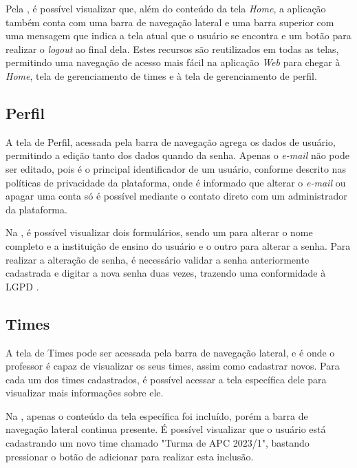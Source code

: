 
Pela , é possível visualizar que, além do conteúdo da tela \textit{Home}, a aplicação também conta com uma barra de navegação lateral e uma barra superior com uma mensagem que indica a tela atual que o usuário se encontra e um botão para realizar o \textit{logout} ao final dela. Estes recursos são reutilizados em todas as telas, permitindo uma navegação de acesso mais fácil na aplicação \textit{Web} para chegar à \textit{Home}, tela de gerenciamento de times e à tela de gerenciamento de perfil.

\subsection{Perfil}

A tela de Perfil, acessada pela barra de navegação agrega os dados de usuário, permitindo a edição tanto dos dados quando da senha. Apenas o \textit{e-mail} não pode ser editado, pois é o principal identificador de um usuário, conforme descrito nas políticas de privacidade da plataforma, onde é informado que alterar o \textit{e-mail} ou apagar uma conta só é possível mediante o contato direto com um administrador da plataforma.


Na , é possível visualizar dois formulários, sendo um para alterar o nome completo e a instituição de ensino do usuário e o outro para alterar a senha. Para realizar a alteração de senha, é necessário validar a senha anteriormente cadastrada e digitar a nova senha duas vezes, trazendo uma conformidade à LGPD \cite{lgpd}.

\subsection{Times}

A tela de Times pode ser acessada pela barra de navegação lateral, e é onde o professor é capaz de visualizar os seus times, assim como cadastrar novos. Para cada um dos times cadastrados, é possível acessar a tela específica dele para visualizar mais informações sobre ele.


Na , apenas o conteúdo da tela específica foi incluído, porém a barra de navegação lateral continua presente. É possível visualizar que o usuário está cadastrando um novo time chamado "Turma de APC 2023/1", bastando pressionar o botão de adicionar para realizar esta inclusão.

